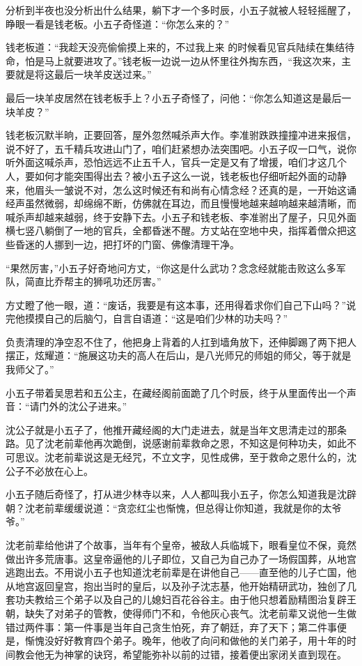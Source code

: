 分析到半夜也没分析出什么结果，躺下才一个多时辰，小五子就被人轻轻摇醒了，睁眼一看是钱老板。小五子奇怪道：“你怎么来的？”

钱老板道：“我趁天没亮偷偷摸上来的，不过我上来
的时候看见官兵陆续在集结待命，怕是马上就要进攻了。”钱老板一边说一边从怀里往外掏东西，“我这次来，主要就是将这最后一块羊皮送过来。”

最后一块羊皮居然在钱老板手上？小五子奇怪了，问他：“你怎么知道这是最后一块羊皮？”

钱老板沉默半晌，正要回答，屋外忽然喊杀声大作。李准驸跌跌撞撞冲进来报信，说不好了，五千精兵攻进山门了，咱们赶紧想办法突围吧。小五子叹一口气，说你听外面这喊杀声，恐怕远远不止五千人，官兵一定是又有了增援，咱们才这几个人，要如何才能突围得出去？被小五子这么一说，钱老板也仔细听起外面的动静来，他眉头一皱说不对，怎么这时候还有和尚有心情念经？还真的是，一开始这诵经声虽然微弱，却绵绵不断，仿佛就在耳边，而且慢慢地越来越响越来越清晰，而喊杀声却越来越弱，终于安静下去。小五子和钱老板、李准驸出了屋子，只见外面横七竖八躺倒了一地的官兵，全都昏迷不醒。方丈站在空地中央，指挥着僧众把这些昏迷的人挪到一边，把打坏的门窗、佛像清理干净。

“果然厉害，”小五子好奇地问方丈，“你这是什么武功？念念经就能击败这么多军队，简直比乔帮主的狮吼功还厉害。”

方丈瞪了他一眼，道：“废话，我要是有这本事，还用得着求你们自己下山吗？”说完他摸摸自己的后脑勺，自言自语道：“这是咱们少林的功夫吗？”

负责清理的净空忍不住了，他把身上背着的人扛到墙角放下，还伸脚踢了两下把人摆正，炫耀道：“施展这功夫的高人在后山，是八光师兄的师姐的师父，等于就是我师父了。”
\newline

小五子带着吴思若和五公主，在藏经阁前面跪了几个时辰，终于从里面传出一个声音：“请门外的沈公子进来。”

沈公子就是小五子了，他推开藏经阁的大门走进去，就是当年文思清走过的那条路。见了沈老前辈他再次跪倒，说感谢前辈救命之恩，不知这是何种功夫，如此不可思议。沈老前辈说这是无经咒，不立文字，见性成佛，至于救命之恩什么的，沈公子不必放在心上。

小五子随后奇怪了，打从进少林寺以来，人人都叫我小五子，你怎么知道我是沈辟朝？沈老前辈缓缓说道：“贪恋红尘也惭愧，但总得让你知道，我就是你的太爷爷。”

沈老前辈给他讲了个故事，当年有个皇帝，被敌人兵临城下，眼看皇位不保，竟然做出许多荒唐事。这皇帝逼他的儿子即位，又自己为自己办了一场假国葬，从地宫逃跑出去。不用说小五子也知道沈老前辈是在讲他自己——直至他的儿子亡国，他从地宫返回皇宫，抱出当时的皇后，以及孙子沈志基，他开始精研武功，独创了几套功夫教给三个弟子以及自己的儿媳妇百花谷谷主。由于他只想着励精图治复辟王朝，缺失了对弟子的管教，使得师门不和，令他灰心丧气。沈老前辈又说他一生做错过两件事：第一件事是当年自己贪生怕死，弃了朝廷，弃了天下；第二件事便是，惭愧没好好教育四个弟子。晚年，他收了向问和做他的关门弟子，用十年的时间教会他无为神掌的诀窍，希望能弥补以前的过错，接着便出家闭关直到现在。

